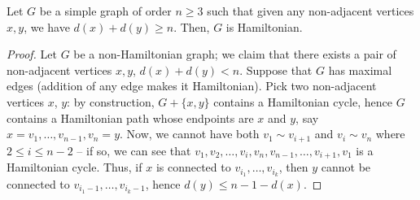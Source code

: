 \documentclass[11pt]{article}
\theoremstyle{definition}
\theoremstyle{remark}
\numberwithin{equation}{section}
\begin{document}
    \begin{theorem}
        Let $G$ be a simple graph of order $n \geq 3$ such that given any
        non-adjacent vertices $x, y$, we have $d(x) + d(y) \geq n$. Then, $G$ is
        Hamiltonian.
    \end{theorem}
    \begin{proof}
        Let $G$ be a non-Hamiltonian graph; we claim that there exists a pair of
        non-adjacent vertices $x, y$, $d(x) + d(y) < n$. Suppose that $G$ has maximal
        edges (addition of any edge makes it Hamiltonian). Pick two non-adjacent
        vertices $x$, $y$: by construction, $G + \{x, y\}$ contains a Hamiltonian
        cycle, hence $G$ contains a Hamiltonian path whose endpoints are $x$ and $y$,
        say $x = v_1, \dots, v_{n - 1}, v_n = y$. Now, we cannot have both $v_1 \sim
        v_{i + 1}$ and $v_i \sim v_n$ where $2 \leq i \leq n - 2$ -- if so, we can
        see that $v_1, v_2, \dots, v_i, v_n, v_{n - 1}, \dots, v_{i + 1}, v_1$ is a
        Hamiltonian cycle. Thus, if $x$ is connected to $v_{i_1}, \dots, v_{i_k}$, then
        $y$ cannot be connected to $v_{i_1 - 1}, \dots, v_{i_k - 1}$, hence $d(y)
        \leq n - 1 - d(x)$.
    \end{proof}
\end{document}
